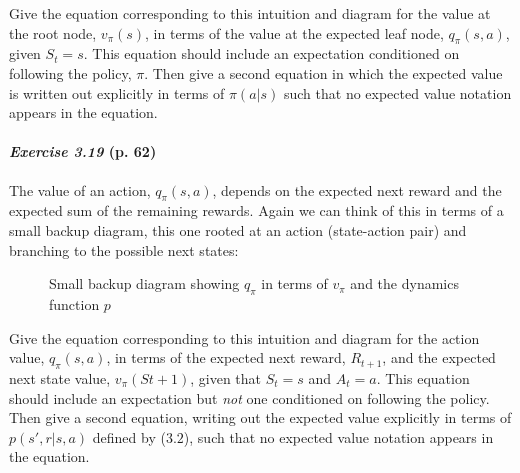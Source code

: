 \documentclass[10pt,a4paper]{article}
\begin{document}
Give the equation corresponding to this intuition and diagram for the value at the root node, $v_\pi(s)$, in terms of the value at the expected leaf node, $q_\pi(s, a)$, given $S_t = s$. This equation should include an expectation conditioned on following the policy, $\pi$. Then give
a second equation in which the expected value is written out explicitly in terms of $\pi(a|s)$ such that no expected value notation appears in the equation.

\clearpage
\paragraph{\textit{Exercise 3.19} (p. 62)} The value of an action, $q_\pi(s, a)$, depends on the expected next reward and
the expected sum of the remaining rewards. Again we can think of this in terms of a
small backup diagram, this one rooted at an action (state-action pair) and branching to
the possible next states:

\begin{figure}[h]
\centering
{}
\caption{Small backup diagram showing $q_\pi$ in terms of $v_\pi$ and the dynamics function $p$}
\label{relation_action_value_state_value}
\end{figure}


Give the equation corresponding to this intuition and diagram for the action value, $q_\pi(s, a)$, in terms of the expected next reward, $R_{t+1}$, and the expected next state value, $v_\pi(St+1)$, given that $S_t=s$ and $A_t=a$. This equation should include an expectation but
\textit{not} one conditioned on following the policy.
Then give a second equation, writing out the expected value explicitly in terms of $p(s', r \lvert s, a)$ defined by ($3.2$), such that no expected value notation appears in the equation.
\end{document}
